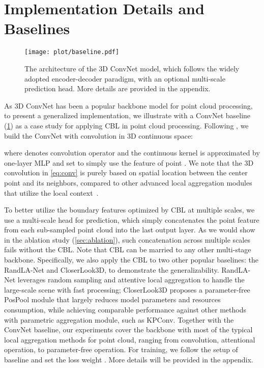 \documentclass[10pt,twocolumn,letterpaper]{article}
\newcommand{\tly}{}
\begin{document}
\section{Implementation Details and Baselines}
\begin{figure}
\begin{center}
  \texttt{[image: plot/baseline.pdf]}
\end{center}
   \caption{The architecture of the 3D ConvNet model, which follows the widely adopted encoder-decoder paradigm, with an optional multi-scale prediction head. More details are provided in the appendix.}
\label{fig:baseline}
\end{figure}
\label{sec:method:arch}
As 3D ConvNet has been a popular backbone model for point cloud processing, to present a generalized implementation, we illustrate with a ConvNet baseline (\cref{fig:baseline}) as a case study for applying CBL in point cloud processing.
Following \cite{convpoints, mtconv}, we build the ConvNet with convolution in 3D continuous space:

where  denotes convolution operator and the continuous kernel  is approximated by one-layer MLP and set  to simply use the feature of point . We note that the 3D convolution in \cref{eq:conv} is purely based on spatial location between the center point and its neighbors, compared to other advanced local aggregation modules that utilize the local context~\cite{randlanet, pttransformer}.

To better utilize the boundary features optimized by CBL at multiple scales, we use a multi-scale head for prediction, which simply concatenates the point feature from each sub-sampled point cloud into the last output layer. As we would show in the ablation study (\cref{sec:ablation}), such concatenation across multiple scales fails without the CBL. Note that CBL can be married to any other multi-stage backbone. Specifically, we also apply the CBL to two other popular baselines: the RandLA-Net\cite{randlanet} and CloserLook3D\cite{closerlook}, to demonstrate the generalizability. RandLA-Net leverages random sampling and attentive local aggregation to handle the large-scale scene with fast processing; CloserLook3D proposes a parameter-free PosPool module that largely reduces model parameters and resources consumption, while achieving comparable performance against other methods with parametric aggregation module, such as KPConv\cite{kpconv}. Together with the ConvNet baseline, our experiments cover the backbone with most of the typical local aggregation methods {\tly for} point cloud, ranging from convolution, attentional operation, to parameter-free operation.
{\tly For training, we follow the setup of baseline and set the loss weight . More details will be provided in the appendix.}
\end{document}
